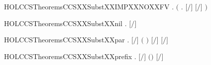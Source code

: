 \newcommand{\HOLCCSTheoremsCCSXXSubstXXelim}{\UseVerbatim{HOLCCSTheoremsCCSXXSubstXXelim}}
\begin{SaveVerbatim}{HOLCCSTheoremsCCSXXSubstXXIMPXXNOXXFV}
\HOLTokenTurnstile{} \HOLSymConst{\HOLTokenForall{}} . \ensuremath{(}\HOLSymConst{\HOLTokenForall{}} . \ensuremath{[}\ensuremath{/}\ensuremath{]}  \HOLSymConst{\ensuremath{=}} \ensuremath{[}\ensuremath{/}\ensuremath{]} \ensuremath{)} \HOLSymConst{\HOLTokenImp{}}  \HOLConst{\HOLTokenNotIn{}}  
\end{SaveVerbatim}
\newcommand{\HOLCCSTheoremsCCSXXSubstXXIMPXXNOXXFV}{\UseVerbatim{HOLCCSTheoremsCCSXXSubstXXIMPXXNOXXFV}}
\begin{SaveVerbatim}{HOLCCSTheoremsCCSXXSubstXXnil}
\HOLTokenTurnstile{} \HOLSymConst{\HOLTokenForall{}} . \ensuremath{[}\ensuremath{/}\ensuremath{]}  \HOLSymConst{\ensuremath{=}} 
\end{SaveVerbatim}
\newcommand{\HOLCCSTheoremsCCSXXSubstXXnil}{\UseVerbatim{HOLCCSTheoremsCCSXXSubstXXnil}}
\begin{SaveVerbatim}{HOLCCSTheoremsCCSXXSubstXXpar}
\HOLTokenTurnstile{} \HOLSymConst{\HOLTokenForall{}}   . \ensuremath{[}\ensuremath{/}\ensuremath{]} \ensuremath{(} \HOLSymConst{\ensuremath{\mid}} \ensuremath{)} \HOLSymConst{\ensuremath{=}} \ensuremath{[}\ensuremath{/}\ensuremath{]}  \HOLSymConst{\ensuremath{\mid}} \ensuremath{[}\ensuremath{/}\ensuremath{]} 
\end{SaveVerbatim}
\newcommand{\HOLCCSTheoremsCCSXXSubstXXpar}{\UseVerbatim{HOLCCSTheoremsCCSXXSubstXXpar}}
\begin{SaveVerbatim}{HOLCCSTheoremsCCSXXSubstXXprefix}
\HOLTokenTurnstile{} \HOLSymConst{\HOLTokenForall{}}   . \ensuremath{[}\ensuremath{/}\ensuremath{]} \ensuremath{(}\HOLSymConst{\ensuremath{\ldotp}}\ensuremath{)} \HOLSymConst{\ensuremath{=}} \HOLSymConst{\ensuremath{\ldotp}}\ensuremath{[}\ensuremath{/}\ensuremath{]} 
\end{SaveVerbatim}
